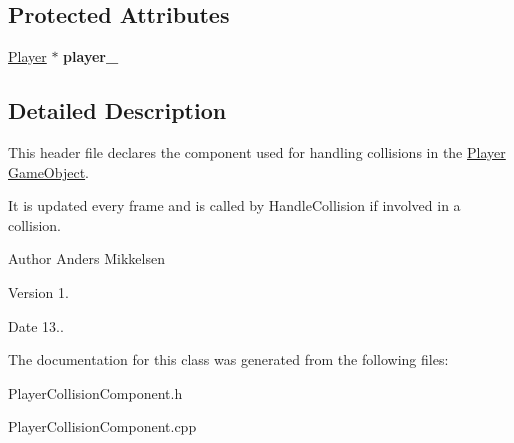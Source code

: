 \subsection*{Protected Attributes}
\begin{DoxyCompactItemize}
\item 
\hypertarget{class_player_collision_component_aaa64c1874d00d74dae3511cda38fcfb5}{}\hyperlink{class_player}{Player} $\ast$ {\bfseries player\+\_\+}\label{class_player_collision_component_aaa64c1874d00d74dae3511cda38fcfb5}

\end{DoxyCompactItemize}


\subsection{Detailed Description}
This header file declares the component used for handling collisions in the \hyperlink{class_player}{Player} \hyperlink{class_game_object}{Game\+Object}. 

It is updated every frame and is called by Handle\+Collision if involved in a collision.

\begin{DoxyAuthor}{Author}
Anders Mikkelsen 
\end{DoxyAuthor}
\begin{DoxyVersion}{Version}
1. 
\end{DoxyVersion}
\begin{DoxyDate}{Date}
13.. 
\end{DoxyDate}


The documentation for this class was generated from the following files\+:\begin{DoxyCompactItemize}
\item 
Player\+Collision\+Component.\+h\item 
Player\+Collision\+Component.\+cpp\end{DoxyCompactItemize}
